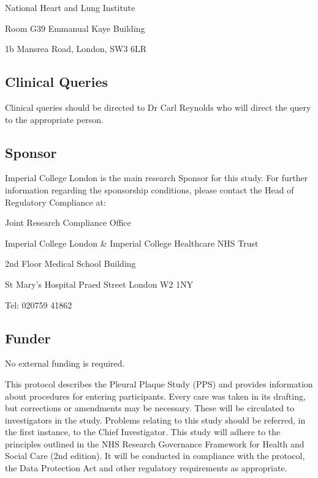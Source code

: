 \documentclass[a4paper,10pt]{article}
\begin{document}
\begin{flushleft}
National Heart and Lung Institute

Room G39 Emmanual Kaye Building

1b Mansrea Road, London, SW3 6LR 


\subsection*{Clinical Queries}

Clinical queries should be directed to Dr Carl Reynolds who will direct the query to the appropriate person.

\subsection*{Sponsor}

Imperial College London is the main research Sponsor for this study. For further information regarding the sponsorship conditions, please contact the Head of Regulatory Compliance at:\vspace{0.5cm}
		
Joint Research Compliance Office

Imperial College London \& Imperial College Healthcare NHS Trust

2nd Floor Medical School Building

St Mary’s Hospital
Praed Street
London
W2 1NY

Tel: 020759 41862

\subsection*{Funder}


No external funding is required. \vspace{0.5cm}

\end{flushleft}


This protocol describes the Pleural Plaque Study (PPS) and provides information about procedures for entering participants. Every care was taken in its drafting, but corrections or amendments may be necessary. These will be circulated to investigators in the study. Problems relating to this study should be referred, in the first instance, to the Chief Investigator. This study will adhere to the principles outlined in the NHS Research Governance Framework for Health and Social Care (2nd edition). It will be conducted in compliance with the protocol, the Data Protection Act and other regulatory requirements as appropriate. 
\end{document}
